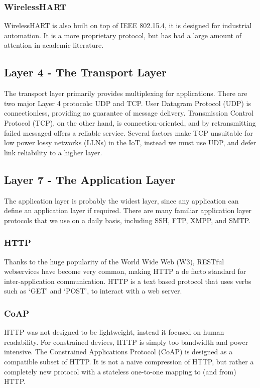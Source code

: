\documentclass[10pt,journal,compsoc]{IEEEtran}
\begin{document}
\subsubsection{WirelessHART}
WirelessHART is also built on top of IEEE 802.15.4, it is designed for
industrial automation. It is a more proprietary protocol, but has had a large
amount of attention in academic literature.  

\subsection{Layer 4 - The Transport Layer}
The transport layer primarily provides multiplexing for applications. There are
two major Layer 4 protocols:  UDP and TCP. User Datagram Protocol (UDP) is
connectionless, providing no guarantee of message delivery.  Transmission Control
Protocol (TCP), on the other hand, is connection-oriented, and by
retransmitting failed messaged offers a reliable service. Several factors make
TCP unsuitable for low power lossy networks (LLNs) in the IoT, instead we must
use UDP, and defer link reliability to a higher layer.

\subsection{Layer 7 - The Application Layer}
The application layer is probably the widest layer, since any application can
define an application layer if required. There are many familiar
application layer protocols that we use on a daily basis, including SSH,
FTP, XMPP, and SMTP. 

\subsubsection{HTTP} 
Thanks to the huge popularity of the World Wide Web (W3), RESTful webservices
have become very common, making HTTP a de facto standard for inter-application
communication. HTTP is a text based protocol that uses verbs such as `GET' and
`POST', to interact with a web server.  

\subsubsection{CoAP}
HTTP was not designed to be lightweight, instead it focused on human
readability. For constrained devices, HTTP is simply too bandwidth and power
intensive. The Constrained Applications Protocol (CoAP) is designed as a
compatible subset of HTTP. It is not a naive compression of HTTP, but rather a
completely new protocol with a stateless one-to-one mapping to (and from) HTTP. 
\end{document}
